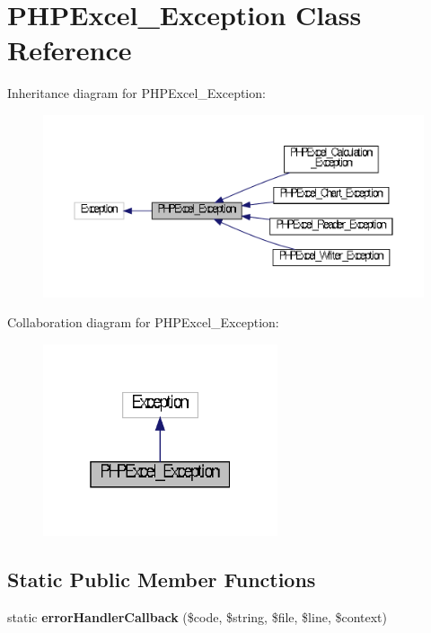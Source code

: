 \section{P\+H\+P\+Excel\+\_\+\+Exception Class Reference}
\label{class_p_h_p_excel___exception}


Inheritance diagram for P\+H\+P\+Excel\+\_\+\+Exception\+:\nopagebreak
\begin{figure}[H]
\begin{center}
\leavevmode
\includegraphics[width=350pt]{class_p_h_p_excel___exception__inherit__graph}
\end{center}
\end{figure}


Collaboration diagram for P\+H\+P\+Excel\+\_\+\+Exception\+:\nopagebreak
\begin{figure}[H]
\begin{center}
\leavevmode
\includegraphics[width=196pt]{class_p_h_p_excel___exception__coll__graph}
\end{center}
\end{figure}
\subsection*{Static Public Member Functions}
\begin{DoxyCompactItemize}
\item 
static {\bf error\+Handler\+Callback} (\$code, \$string, \$file, \$line, \$context)
\end{DoxyCompactItemize}


